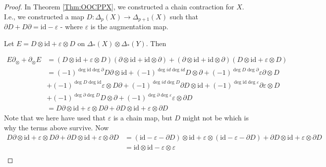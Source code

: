 \documentclass[reqno]{amsart}
\theoremstyle{definition}
\theoremstyle{remark}
\newcommand{\id}{{\mathrm{id}}}
\begin{document}
\begin{proof}
    In Theorem \ref{Thm:OOCPPX}, we constructed a
    chain contraction for $X$. I.e., we
    constructed a map $D \colon \Delta_p(X) \to 
    \Delta_{p+1}(X)$ such that
    $\partial D + D \partial = \id - \varepsilon$ - where
    $\varepsilon$ is the augmentation map.

    Let $E = 
    D \otimes \id + \varepsilon \otimes D$ on
    $\Delta_*(X) \otimes \Delta_*(Y)$. Then

    \begin{align*}
        E \partial_{\otimes} + 
        \partial_{\otimes} E 
        &= (D \otimes \id + \varepsilon \otimes D)
        \left( \partial \otimes \id + \id \otimes \partial \right) 
        + \left( \partial \otimes \id + \id \otimes
        \partial \right) \left( D \otimes \id + \varepsilon
        \otimes D\right) \\
        &= (-1)^{\deg \id \deg \partial }
        D \partial \otimes \id
        + (-1)^{\deg id \deg id}D \otimes \partial 
        + (-1)^{\deg D \deg \partial} \varepsilon \partial
        \otimes D\\ 
        &+ (-1)^{\deg D \deg \id}
        \varepsilon \otimes D \partial 
        + (-1)^{\deg id \deg D} \partial D \otimes \id
        + (-1)^{\deg \id \deg \varepsilon}
        \partial \varepsilon \otimes D \\
        &+ (-1)^{\deg \partial \deg D}
        D \otimes \partial
        +
        (-1)^{\deg \partial \deg \varepsilon}
        \varepsilon \otimes \partial D \\
        &= D \partial \otimes \id
        + \varepsilon \otimes D \partial
        + \partial D \otimes \id
        + \varepsilon \otimes \partial D
    \end{align*}
    Note that we here have used that $\varepsilon$ is a chain
    map, but $D$ might not be which is why the
    terms above survive.
    Now
    \begin{align*}
        D \partial \otimes \id + \varepsilon \otimes D \partial
        + \partial D \otimes \id + \varepsilon \otimes \partial D
        &= (\id - \varepsilon - \partial D)
        \otimes \id + \varepsilon \otimes
        (\id - \varepsilon - \partial D)
        + \partial D \otimes \id + \varepsilon \otimes
        \partial D\\
        &= \id \otimes \id 
        - \varepsilon \otimes \varepsilon \\
    \end{align*}
\end{proof}
\end{document}
